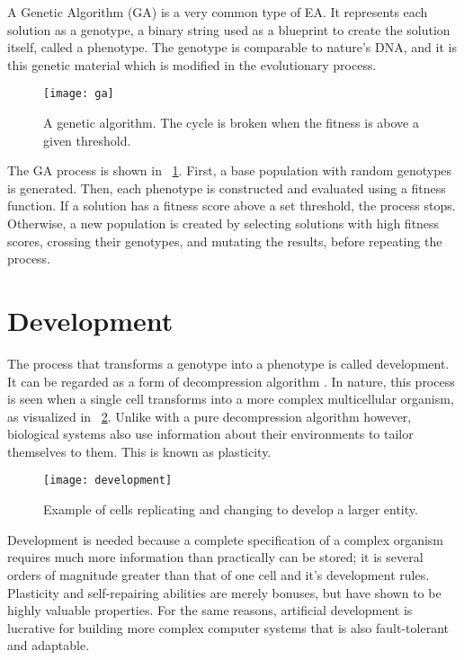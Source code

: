 A Genetic Algorithm (GA) is a very common type of EA.
It represents each solution as a genotype, a binary string used as a blueprint to create the solution itself, called a phenotype.
The genotype is comparable to nature's DNA, and it is this genetic material which is modified in the evolutionary process.

\begin{figure}[!ht]
    \centering
    \texttt{[image: ga]}
    \caption[Genetic Algorithm]{
        A genetic algorithm.
        The cycle is broken when the fitness is above a given threshold.
    }
    \label{fig:ga}
\end{figure}

The GA process is shown in \figurename~\ref{fig:ga}.
First, a base population with random genotypes is generated.
Then, each phenotype is constructed and evaluated using a fitness function.
If a solution has a fitness score above a set threshold, the process stops.
Otherwise, a new population is created by selecting solutions with high fitness scores, crossing their genotypes, and mutating the results, before repeating the process.


\section{Development}

The process that transforms a genotype into a phenotype is called development.
It can be regarded as a form of decompression algorithm \cite{harding2008artificial}.
In nature, this process is seen when a single cell transforms into a more complex multicellular organism, as visualized in \figurename~\ref{fig:development}.
Unlike with a pure decompression algorithm however, biological systems also use information about their environments to tailor themselves to them.
This is known as plasticity.

\begin{figure}[!ht]
    \centering
    \texttt{[image: development]}
    \caption[Development]{
        Example of cells replicating and changing to develop a larger entity.
    }
    \label{fig:development}
\end{figure}

Development is needed because a complete specification of a complex organism requires much more information than practically can be stored; it is several orders of magnitude greater than that of one cell and it's development rules.
Plasticity and self-repairing abilities are merely bonuses, but have shown to be highly valuable properties.
For the same reasons, artificial development is lucrative for building more complex computer systems that is also fault-tolerant and adaptable.

